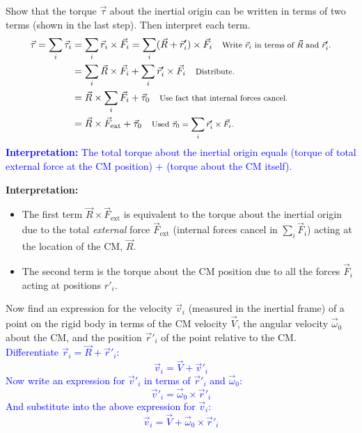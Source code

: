\documentclass[11pt, letterpaper, openany]{book}
\newenvironment{exercise}[1][Exercise]{%
  \tcolorbox[blanker, breakable, left=1em,
    before skip=1em, after skip=1em,
    borderline west={3pt}{0pt}{PhysNavy},
    colback=PhysCream,
    before upper={\textcolor{PhysNavy}{\sffamily\bfseries #1:}\space}
  ]%
}{%
  \endtcolorbox%
}
\begin{document}
\begin{exercise}[Exercise 6]
Show that the torque $\vec{\tau}$ about the inertial origin can be written in terms of two terms (shown in the last step). Then interpret each term. \\
\textcolor{blue}{
\begin{align*}
    \vec{\tau} = \sum_i \vec{\tau}_i &= \sum_i \vec{r}_i \times \vec{F}_i = \sum_i (\vec{R} + \vec{r}'_i) \times \vec{F}_i \quad \text{\footnotesize{Write $\vec{r}_i$ in terms of $\vec{R}$ and $\vec{r}'_i$.}} \\
    &= \sum_i \vec{R} \times \vec{F}_i + \sum_i \vec{r}'_i \times \vec{F}_i \quad \text{\footnotesize{Distribute.}} \\
    &= \vec{R} \times \sum_i \vec{F}_i + \vec{\tau}_0 \quad \text{\footnotesize{Use fact that internal forces cancel.}} \\
    &= \vec{R} \times \vec{F}_{\text{ext}} + \vec{\tau}_0 \quad \text{\footnotesize{Used $\vec{\tau}_0 = \sum_i \vec{r}'_i \times \vec{F}_i$.}}
\end{align*}
\textbf{Interpretation:} The total torque about the inertial origin equals (torque of total external force at the CM position) + (torque about the CM itself).
}
\end{exercise}

\textbf{Interpretation:}
\begin{itemize}
    \item The first term $\vec{R} \times \vec{F}_{\text{ext}}$ is equivalent to the torque about the inertial origin due to the total \textit{external} force $\vec{F}_{\text{ext}}$ (internal forces cancel in $\sum_i \vec{F}_i$) acting at the location of the CM, $\vec{R}$.
    \item The second term is the torque about the CM position due to all the forces $\vec{F}_i$ acting at positions $r'_i$.
\end{itemize}

\begin{exercise}[Exercise 7]
Now find an expression for the velocity $\vec{v}_i$ (measured in the inertial frame) of a point on the rigid body in terms of the CM velocity $\vec{V}$, the angular velocity $\vec{\omega}_0$ about the CM, and the position $\vec{r}'_i$ of the point relative to the CM. \\
\textcolor{blue}{
Differentiate $\vec{r}_i = \vec{R} + \vec{r}'_i$:
\[ \vec{v}_i = \vec{V} + \vec{v}'_i \]
Now write an expression for $\vec{v}'_i$ in terms of $\vec{r}'_i$ and $\vec{\omega}_0$:
\[ \vec{v}'_i = \vec{\omega}_0 \times \vec{r}'_i \]
And substitute into the above expression for $\vec{v}_i$:
\[ \vec{v}_i = \vec{V} + \vec{\omega}_0 \times \vec{r}'_i \]
}
\end{exercise}
\end{document}
